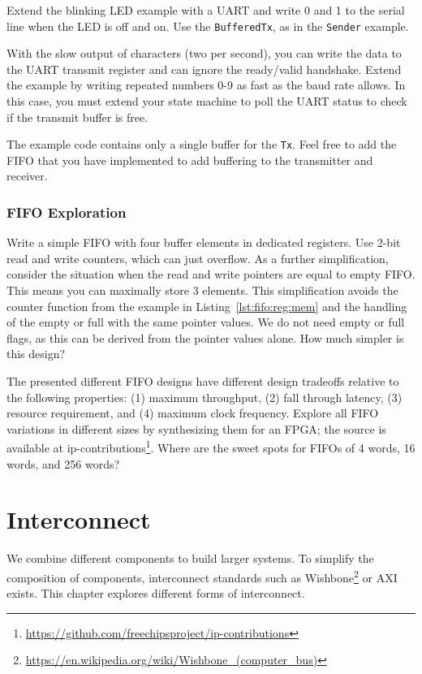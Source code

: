\documentclass[%
    10pt,
    headinclude, footinclude=false,
    openright, %
    notitlepage,
    cleardoublepage=empty,
    headsepline,
    numbers=noenddot,
    bibliography=totoc, index=totoc,
    ]{scrbook}
\newcommand{\code}[1]{{\lstinline[basicstyle=\small\ttfamily]{#1}}}
\newcommand{\myref}[2]{\href{#1}{#2}}
\renewcommand{\myref}[2]{{#2}{\footnote{\url{#1}}}}
\begin{document}
Extend the blinking LED example with a UART and write 0 and 1 to the serial
line when the LED is off and on. Use the \code{BufferedTx}, as in the \code{Sender}
example.

With the slow output of characters (two per second), you can write the data
to the UART transmit register and can ignore the ready/valid handshake.
Extend the example by writing repeated numbers 0-9 as fast as the baud rate allows.
In this case, you must extend your state machine to poll the UART status
to check if the transmit buffer is free.

The example code contains only a single buffer for the \code{Tx}. Feel free to
add the FIFO that you have implemented to add buffering to the transmitter
and receiver.

\subsection{FIFO Exploration}

Write a simple FIFO with four buffer elements in dedicated registers.
Use 2-bit read and write counters, which can just overflow.
As a further simplification, consider the situation when the read and write
pointers are equal to empty FIFO. This means you can maximally
store 3 elements. This simplification avoids the counter function from
the example in Listing~\ref{lst:fifo:reg:mem} and the handling
of the empty or full with the same pointer values. We do not need
empty or full flags, as this can be derived from the pointer values
alone. How much simpler is this design?

The presented different FIFO designs have different design tradeoffs
relative to the following properties: (1) maximum throughput,
(2) fall through latency, (3) resource requirement, and (4)
maximum clock frequency. Explore all FIFO variations in different sizes by
synthesizing them for an FPGA; the source is available at
\myref{https://github.com/freechipsproject/ip-contributions}{ip-contributions}.
Where are the sweet spots for FIFOs of 4 words, 16 words, and 256 words?

\chapter{Interconnect}
\label{chap:interconnect}

We combine different components to build larger systems.
To simplify the composition of components, interconnect standards such as
\myref{https://en.wikipedia.org/wiki/Wishbone_(computer_bus)}{Wishbone}
or AXI exists. This chapter explores different forms of interconnect.
\end{document}
